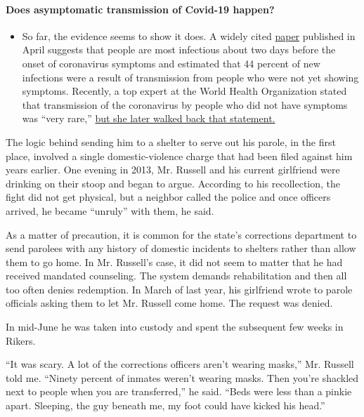 \begin{itemize}
{  \paragraph{Does asymptomatic transmission of Covid-19
  happen?}\label{does-asymptomatic-transmission-of-covid-19-happen}}

  \begin{itemize}
  \tightlist
  \item
    So far, the evidence seems to show it does. A widely cited
    \href{https://www.nature.com/articles/s41591-020-0869-5}{paper}
    published in April suggests that people are most infectious about
    two days before the onset of coronavirus symptoms and estimated that
    44 percent of new infections were a result of transmission from
    people who were not yet showing symptoms. Recently, a top expert at
    the World Health Organization stated that transmission of the
    coronavirus by people who did not have symptoms was ``very rare,''
    \href{https://www.nytimes.com/2020/06/09/world/coronavirus-updates.html?action=click\&pgtype=Article\&state=default\&region=MAIN_CONTENT_3\&context=storylines_faq\#link-1f302e21}{but
    she later walked back that statement.}
  \end{itemize}
\end{itemize}

The logic behind sending him to a shelter to serve out his parole, in
the first place, involved a single domestic-violence charge that had
been filed against him years earlier. One evening in 2013, Mr. Russell
and his current girlfriend were drinking on their stoop and began to
argue. According to his recollection, the fight did not get physical,
but a neighbor called the police and once officers arrived, he became
``unruly'' with them, he said.

As a matter of precaution, it is common for the state's corrections
department to send parolees with any history of domestic incidents to
shelters rather than allow them to go home. In Mr. Russell's case, it
did not seem to matter that he had received mandated counseling. The
system demands rehabilitation and then all too often denies redemption.
In March of last year, his girlfriend wrote to parole officials asking
them to let Mr. Russell come home. The request was denied.

In mid-June he was taken into custody and spent the subsequent few weeks
in Rikers.

``It was scary. A lot of the corrections officers aren't wearing
masks,'' Mr. Russell told me. ``Ninety percent of inmates weren't
wearing masks. Then you're shackled next to people when you are
transferred,'' he said. ``Beds were less than a pinkie apart. Sleeping,
the guy beneath me, my foot could have kicked his head.''

